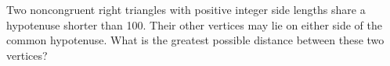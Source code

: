 Two noncongruent right triangles with positive integer side lengths share a hypotenuse shorter than 100. Their other vertices may lie on either side of the common hypotenuse. What is the greatest possible distance between these two vertices?
